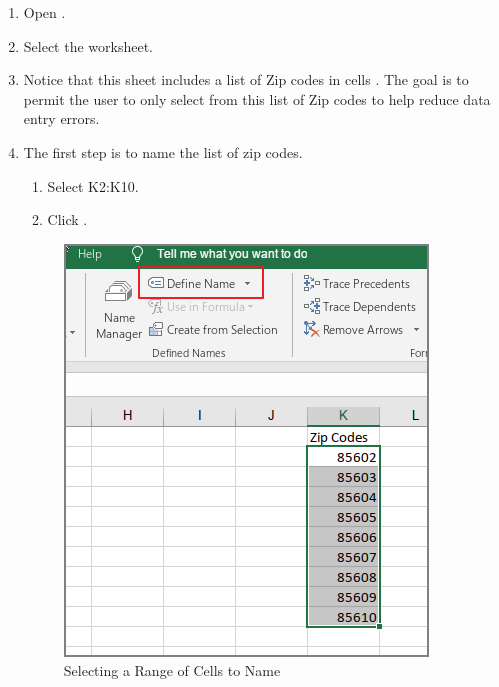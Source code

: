 \begin{enumerate}
	\item Open .
	\item Select the  worksheet.
	\item Notice that this sheet includes a list of Zip codes in cells . The goal is to permit the user to only select from this list of Zip codes to help reduce data entry errors.
	\item The first step is to name the list of zip codes.
	
	\begin{enumerate}
		\item Select K2:K10.
		\item Click .
		\end{enumerate}
		
		\begin{figure}[H]
			\centering
			\includegraphics[width=\maxwidth{.95\linewidth}]{gfx/ch07_fig33}
			\caption{Selecting a Range of Cells to Name}
			\label{07:fig33}
		\end{figure}
		

\end{enumerate}
